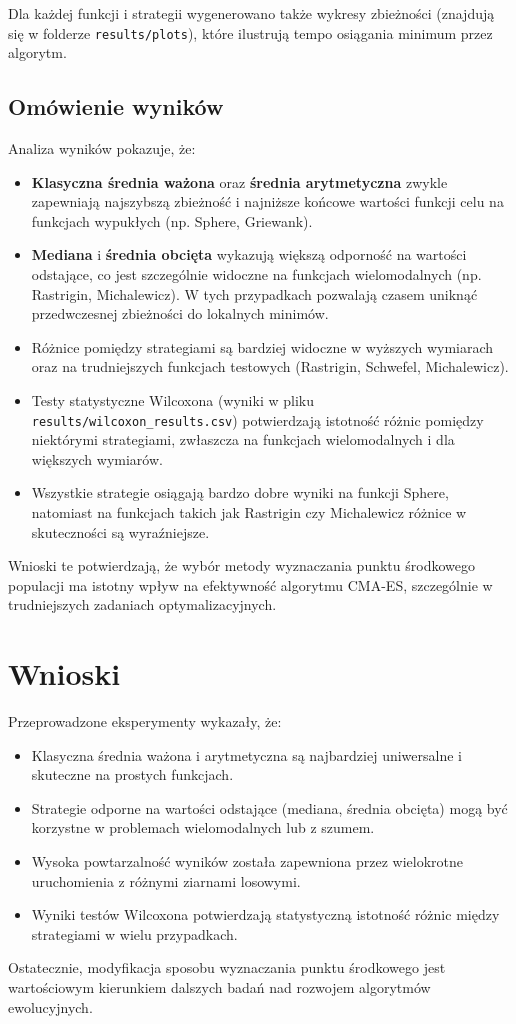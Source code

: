 \documentclass{article}
\begin{document}
Dla każdej funkcji i strategii wygenerowano także wykresy zbieżności (znajdują się w folderze \texttt{results/plots}), które ilustrują tempo osiągania minimum przez algorytm.

\subsection{Omówienie wyników}

Analiza wyników pokazuje, że:
\begin{itemize}
    \item \textbf{Klasyczna średnia ważona} oraz \textbf{średnia arytmetyczna} zwykle zapewniają najszybszą zbieżność i najniższe końcowe wartości funkcji celu na funkcjach wypukłych (np. Sphere, Griewank).
    \item \textbf{Mediana} i \textbf{średnia obcięta} wykazują większą odporność na wartości odstające, co jest szczególnie widoczne na funkcjach wielomodalnych (np. Rastrigin, Michalewicz). W tych przypadkach pozwalają czasem uniknąć przedwczesnej zbieżności do lokalnych minimów.
    \item Różnice pomiędzy strategiami są bardziej widoczne w wyższych wymiarach oraz na trudniejszych funkcjach testowych (Rastrigin, Schwefel, Michalewicz).
    \item Testy statystyczne Wilcoxona (wyniki w pliku \texttt{results/wilcoxon_results.csv}) potwierdzają istotność różnic pomiędzy niektórymi strategiami, zwłaszcza na funkcjach wielomodalnych i dla większych wymiarów.
    \item Wszystkie strategie osiągają bardzo dobre wyniki na funkcji Sphere, natomiast na funkcjach takich jak Rastrigin czy Michalewicz różnice w skuteczności są wyraźniejsze.
\end{itemize}

Wnioski te potwierdzają, że wybór metody wyznaczania punktu środkowego populacji ma istotny wpływ na efektywność algorytmu CMA-ES, szczególnie w trudniejszych zadaniach optymalizacyjnych.

\section{Wnioski}

Przeprowadzone eksperymenty wykazały, że:
\begin{itemize}
    \item Klasyczna średnia ważona i arytmetyczna są najbardziej uniwersalne i skuteczne na prostych funkcjach.
    \item Strategie odporne na wartości odstające (mediana, średnia obcięta) mogą być korzystne w problemach wielomodalnych lub z szumem.
    \item Wysoka powtarzalność wyników została zapewniona przez wielokrotne uruchomienia z różnymi ziarnami losowymi.
    \item Wyniki testów Wilcoxona potwierdzają statystyczną istotność różnic między strategiami w wielu przypadkach.
\end{itemize}

Ostatecznie, modyfikacja sposobu wyznaczania punktu środkowego jest wartościowym kierunkiem dalszych badań nad rozwojem algorytmów ewolucyjnych.
\end{document}
